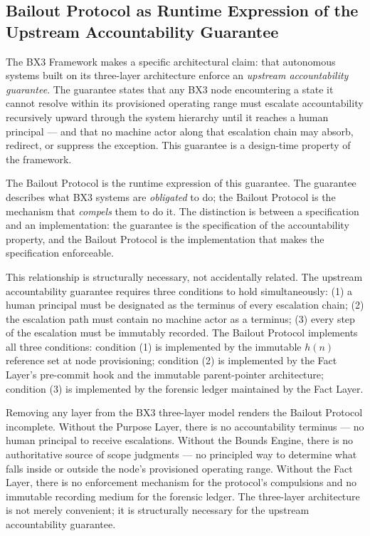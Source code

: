 \subsection{Bailout Protocol as Runtime Expression of the Upstream Accountability Guarantee}
\label{sec:runtime-expression}

The BX3 Framework makes a specific architectural claim: that autonomous systems
built on its three-layer architecture enforce an \emph{upstream accountability
guarantee}. The guarantee states that any BX3 node encountering a state it cannot
resolve within its provisioned operating range must escalate accountability
recursively upward through the system hierarchy until it reaches a human principal
— and that no machine actor along that escalation chain may absorb, redirect, or
suppress the exception. This guarantee is a design-time property of the framework.

The Bailout Protocol is the runtime expression of this guarantee. The guarantee
describes what BX3 systems are \emph{obligated} to do; the Bailout Protocol is the
mechanism that \emph{compels} them to do it. The distinction is between a
specification and an implementation: the guarantee is the specification of the
accountability property, and the Bailout Protocol is the implementation that makes
the specification enforceable.

This relationship is structurally necessary, not accidentally related. The upstream
accountability guarantee requires three conditions to hold simultaneously:
(1) a human principal must be designated as the terminus of every escalation chain;
(2) the escalation path must contain no machine actor as a terminus;
(3) every step of the escalation must be immutably recorded.
The Bailout Protocol implements all three conditions:
condition (1) is implemented by the immutable $h(n)$ reference set at node
provisioning;
condition (2) is implemented by the Fact Layer's pre-commit hook and the immutable
parent-pointer architecture;
condition (3) is implemented by the forensic ledger maintained by the Fact Layer.

Removing any layer from the BX3 three-layer model renders the Bailout Protocol
incomplete. Without the Purpose Layer, there is no accountability terminus — no
human principal to receive escalations. Without the Bounds Engine, there is no
authoritative source of scope judgments — no principled way to determine what falls
inside or outside the node's provisioned operating range. Without the Fact Layer,
there is no enforcement mechanism for the protocol's compulsions and no immutable
recording medium for the forensic ledger. The three-layer architecture is not merely
convenient; it is structurally necessary for the upstream accountability guarantee.

